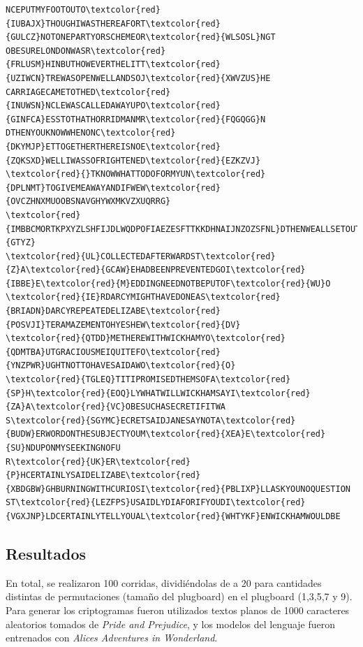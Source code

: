 \documentclass[a4paper,10pt]{article}
\begin{document}
\begin{small}
\begin{Verbatim}[commandchars=\\\{\}]
NCEPUTMYFOOTOUTO\textcolor{red}{IUBAJX}THOUGHIWASTHEREAFORT\textcolor{red}{GULCZ}NOTONEPARTYORSCHEMEOR\textcolor{red}{WLSOSL}NGT
OBESURELONDONWASR\textcolor{red}{FRLUSM}HINBUTHOWEVERTHELITT\textcolor{red}{UZIWCN}TREWASOPENWELLANDSOJ\textcolor{red}{XWVZUS}HE
CARRIAGECAMETOTHED\textcolor{red}{INUWSN}NCLEWASCALLEDAWAYUPO\textcolor{red}{GINFCA}ESSTOTHATHORRIDMANMR\textcolor{red}{FQGQGG}N
DTHENYOUKNOWWHENONC\textcolor{red}{DKYMJP}ETTOGETHERTHEREISNOE\textcolor{red}{ZQKSXD}WELLIWASSOFRIGHTENED\textcolor{red}{EZKZVJ}
\textcolor{red}{}TKNOWWHATTODOFORMYUN\textcolor{red}{DPLNMT}TOGIVEMEAWAYANDIFWEW\textcolor{red}{OVCZHNXMUOOBSNAVGHYWXMKVZXUQRRG}
\textcolor{red}{IMBBCMORTKPXYZLSHFIJDLWQDPOFIAEZESFTTKKDHNAIJNZOZSFNL}DTHENWEALLSETOUTHOWE\textcolor{red}{GTYZ}
\textcolor{red}{UL}COLLECTEDAFTERWARDST\textcolor{red}{Z}A\textcolor{red}{GCAW}EHADBEENPREVENTEDGOI\textcolor{red}{IBBE}E\textcolor{red}{M}EDDINGNEEDNOTBEPUTOF\textcolor{red}{WU}O
\textcolor{red}{IE}RDARCYMIGHTHAVEDONEAS\textcolor{red}{BRIADN}DARCYREPEATEDELIZABE\textcolor{red}{POSVJI}TERAMAZEMENTOHYESHEW\textcolor{red}{DV}
\textcolor{red}{QTDD}METHEREWITHWICKHAMYO\textcolor{red}{QDMTBA}UTGRACIOUSMEIQUITEFO\textcolor{red}{YNZPWR}UGHTNOTTOHAVESAIDAWO\textcolor{red}{O}
\textcolor{red}{TGLEQ}TITIPROMISEDTHEMSOFA\textcolor{red}{SP}H\textcolor{red}{EOQ}LYWHATWILLWICKHAMSAYI\textcolor{red}{ZA}A\textcolor{red}{VC}OBESUCHASECRETIFITWA
S\textcolor{red}{SGYMC}ECRETSAIDJANESAYNOTA\textcolor{red}{BUDW}ERWORDONTHESUBJECTYOUM\textcolor{red}{XEA}E\textcolor{red}{SU}NDUPONMYSEEKINGNOFU
R\textcolor{red}{UK}ER\textcolor{red}{P}HCERTAINLYSAIDELIZABE\textcolor{red}{XBDGBW}GHBURNINGWITHCURIOSI\textcolor{red}{PBLIXP}LLASKYOUNOQUESTION
ST\textcolor{red}{LEZFPS}USAIDLYDIAFORIFYOUDI\textcolor{red}{VGXJNP}LDCERTAINLYTELLYOUAL\textcolor{red}{WHTYKF}ENWICKHAMWOULDBE
\end{Verbatim}
\end{small}

\subsection{Resultados}

En total, se realizaron 100 corridas, dividiéndolas de a 20 para cantidades distintas de permutaciones (tamaño del plugboard) en el plugboard (1,3,5,7 y 9). Para generar los criptogramas fueron utilizados textos planos de 1000 caracteres aleatorios tomados de \textit{Pride and Prejudice}, y los modelos del lenguaje fueron entrenados con \textit{Alices Adventures in Wonderland}.
\end{document}
